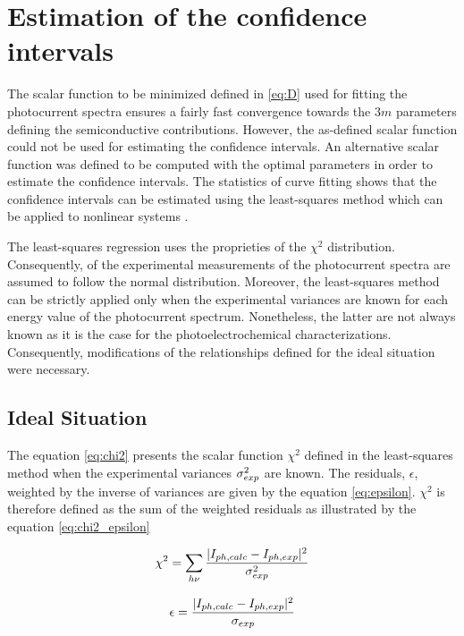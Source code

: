 \section{Estimation of the confidence intervals}

The scalar function to be minimized defined in \ref{eq:D} used for fitting 
the photocurrent spectra ensures a fairly fast convergence towards the $3m$ 
parameters defining the semiconductive contributions. However, the as-defined 
scalar function could not be used for estimating the confidence intervals. 
An alternative scalar function was defined to be computed with the optimal 
parameters in order to estimate the confidence intervals. 
The statistics of curve fitting shows that the confidence intervals can be 
estimated using the least-squares method which can be applied to nonlinear 
systems \citep{bevington2003,nocedal2006}.

The least-squares regression uses the proprieties of the $\chi ^2$ distribution. 
Consequently, of the experimental measurements of the photocurrent spectra are 
assumed to follow the normal distribution. Moreover, the least-squares method 
can be strictly applied only when the experimental variances are known for 
each energy value of the photocurrent spectrum. Nonetheless, the latter are 
not always known as it is the case for the photoelectrochemical characterizations. 
Consequently, modifications of the relationships defined for the ideal 
situation were necessary.

\subsection{Ideal Situation}
The equation \ref{eq:chi2} presents the scalar function $\chi ^2$ defined in 
the least-squares method when the experimental variances $\sigma _{exp} ^2$ are known. 
The residuals, $\epsilon$, weighted by the inverse of variances are given by 
the equation \ref{eq:epsilon}. $\chi ^2$ is therefore defined as the sum of 
the weighted residuals as illustrated by the equation \ref{eq:chi2_epsilon}

\begin{equation}
\begin{split}
\chi ^2 = \sum _{h\nu} \frac{\vert I_{ph,calc}-I_{ph,exp} \vert^2}{\sigma _{exp}^2}
\end{split}
\label{eq:chi2}
\end{equation}

\begin{equation}
\begin{split}
\epsilon = \frac{\vert I_{ph,calc}-I_{ph,exp} \vert^2}{\sigma _{exp}}
\end{split}
\label{eq:epsilon}
\end{equation}

